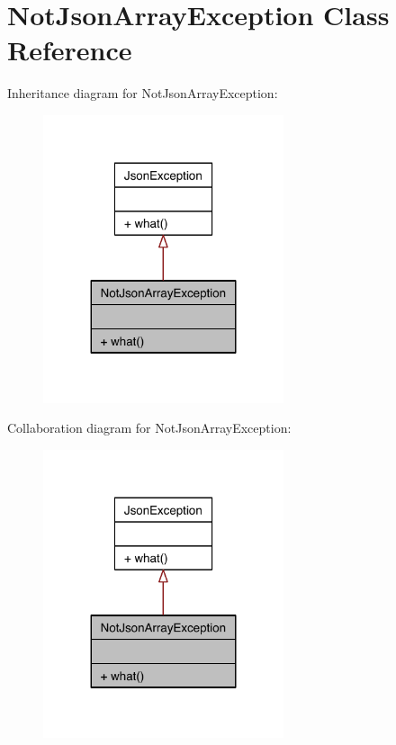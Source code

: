 \hypertarget{class_not_json_array_exception}{\section{Not\-Json\-Array\-Exception Class Reference}
\label{class_not_json_array_exception}
}


Inheritance diagram for Not\-Json\-Array\-Exception\-:\nopagebreak
\begin{figure}[H]
\begin{center}
\leavevmode
\includegraphics[width=200pt]{class_not_json_array_exception__inherit__graph}
\end{center}
\end{figure}


Collaboration diagram for Not\-Json\-Array\-Exception\-:\nopagebreak
\begin{figure}[H]
\begin{center}
\leavevmode
\includegraphics[width=200pt]{class_not_json_array_exception__coll__graph}
\end{center}
\end{figure}
